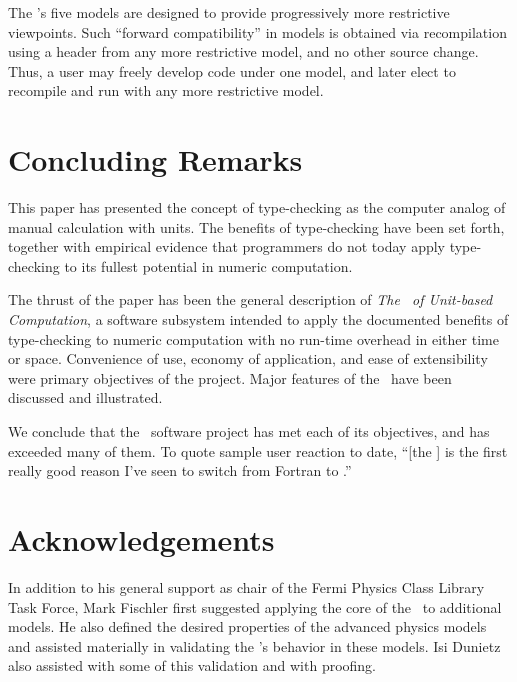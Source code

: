 The \lib's five models are designed to provide
progressively more restrictive viewpoints.
Such ``forward compatibility'' in models
is obtained via recompilation using a header
from any more restrictive model,
and no other source change.
Thus, a user may freely develop code under one model,
and later elect to recompile and run with any more restrictive model.




\section{ Concluding Remarks }

This paper has presented the concept of type-checking
as the computer analog of manual calculation with units.
The benefits of type-checking have been set forth,
together with empirical evidence
that programmers do not today apply type-checking to its fullest potential
in numeric computation.

The thrust of the paper has been the general description
of {\it The \SIlib\ of Unit-based Computation},
a software subsystem
intended to apply the documented benefits of type-checking
to numeric computation
with no run-time overhead in either time or space.
Convenience of use, economy of application, and ease of extensibility
were primary objectives of the project.
Major features of the \SIlib\ 
have been discussed and illustrated.

We conclude that the \SIlib\ software project
has met each of its objectives, and has exceeded many of them.
To quote sample user reaction to date,
``[the \SIlib]
is the first really good reason I've seen
to switch from Fortran to \cpp.''




\section{ Acknowledgements }

In addition to his general support
as chair of the Fermi Physics Class Library Task Force,
Mark Fischler
first suggested applying the core of the \SIlib\ 
to additional models.
He also defined the desired properties of the advanced physics models
and assisted materially
in validating the \lib's behavior
in these models.
Isi Dunietz
also assisted with some of this validation
and with proofing.


